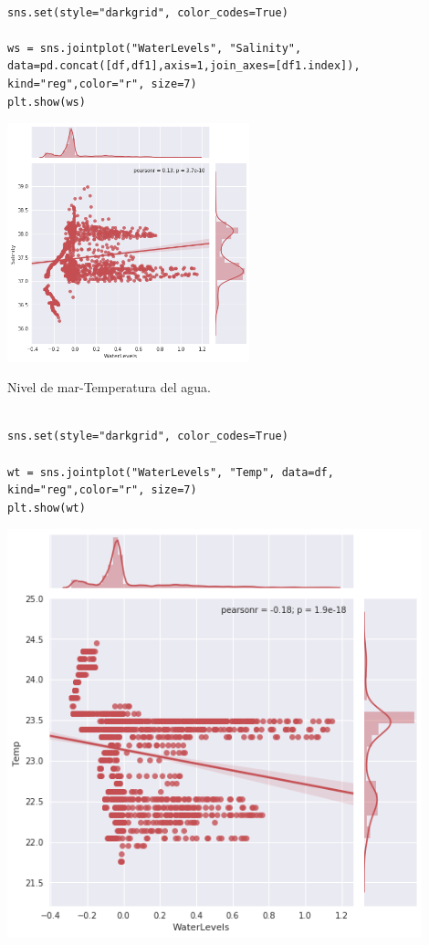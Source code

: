 \documentclass{article} %
\begin{document}
\begin{verbatim} 

sns.set(style="darkgrid", color_codes=True)

ws = sns.jointplot("WaterLevels", "Salinity", data=pd.concat([df,df1],axis=1,join_axes=[df1.index]), kind="reg",color="r", size=7)
plt.show(ws)

\end{verbatim}

 \begin{center}
 	\includegraphics[width=7cm]{ws.png}
 \end{center}

Nivel de mar-Temperatura del agua.

\begin{verbatim} 

sns.set(style="darkgrid", color_codes=True)

wt = sns.jointplot("WaterLevels", "Temp", data=df, kind="reg",color="r", size=7)
plt.show(wt)

\end{verbatim}


 \begin{center}
 	\includegraphics[width=12cm]{wt.png}
 \end{center}
\end{document}

